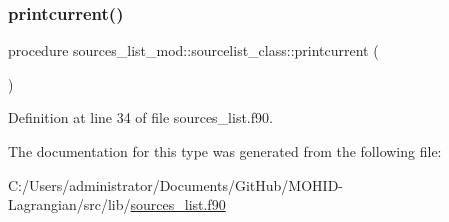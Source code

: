 \subsubsection{\texorpdfstring{printcurrent()}{printcurrent()}}
{\footnotesize\ttfamily procedure sources\+\_\+list\+\_\+mod\+::sourcelist\+\_\+class\+::printcurrent (\begin{DoxyParamCaption}{ }\end{DoxyParamCaption})\hspace{0.3cm}{\ttfamily [private]}}



Definition at line 34 of file sources\+\_\+list.\+f90.



The documentation for this type was generated from the following file\+:\begin{DoxyCompactItemize}
\item 
C\+:/\+Users/administrator/\+Documents/\+Git\+Hub/\+M\+O\+H\+I\+D-\/\+Lagrangian/src/lib/\mbox{\hyperlink{sources__list_8f90}{sources\+\_\+list.\+f90}}\end{DoxyCompactItemize}
